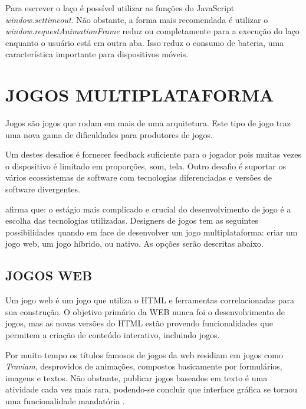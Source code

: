 Para escrever o laço é possível utilizar as funções do JavaScript
\textit{window.settimeout}. Não obstante, a forma mais recomendada é
utilizar o \textit{window.requestAnimationFrame} reduz ou completamente
para a execução do laço enquanto o usuário está em outra aba.
Isso reduz o consumo de bateria, uma característica importante para
dispositivos móveis.

\section{JOGOS MULTIPLATAFORMA}
\begin{draft}

Jogos são jogos que rodam em mais de uma arquitetura.
Este tipo de jogo traz uma nova gama de dificuldades para produtores de jogos.

Um destes desafios é fornecer feedback
suficiente para o jogador pois muitas vezes o dispositivo é limitado em
proporções, som, tela. Outro desafio é suportar os vários ecossistemas
de software com tecnologias diferenciadas e versões de software
divergentes.


\cite{html5mostwanted} afirma que: o estágio mais complicado e crucial
do desenvolvimento de jogo é a escolha das tecnologias utilizadas.
Designers de jogos tem as seguintes possibilidades quando em face
de desenvolver um jogo multiplataforma: criar um jogo web, um jogo
híbrido, ou nativo. As opções serão descritas abaixo.

\subsection{JOGOS WEB}

Um jogo web é um jogo que utiliza o HTML e ferramentas correlacionadas
para sua construção.
O objetivo primário da WEB nunca foi o desenvolvimento de
jogos, mas as novas versões do HTML estão provendo funcionalidades
que permitem a criação de conteúdo interativo, incluindo jogos.

Por muito tempo os títulos famosos de jogos da web residiam em jogos
como \textit{Traviam}, desprovidos de animações, compostos basicamente
por formulários, imagens e textos. Não obstante, publicar jogos
baseados em texto é uma atividade cada vez mais rara, podendo-se
concluir que interface gráfica se tornou uma funcionalidade mandatória
\autocite{browserGamesTechnologyAndFuture}.


\end{draft}
